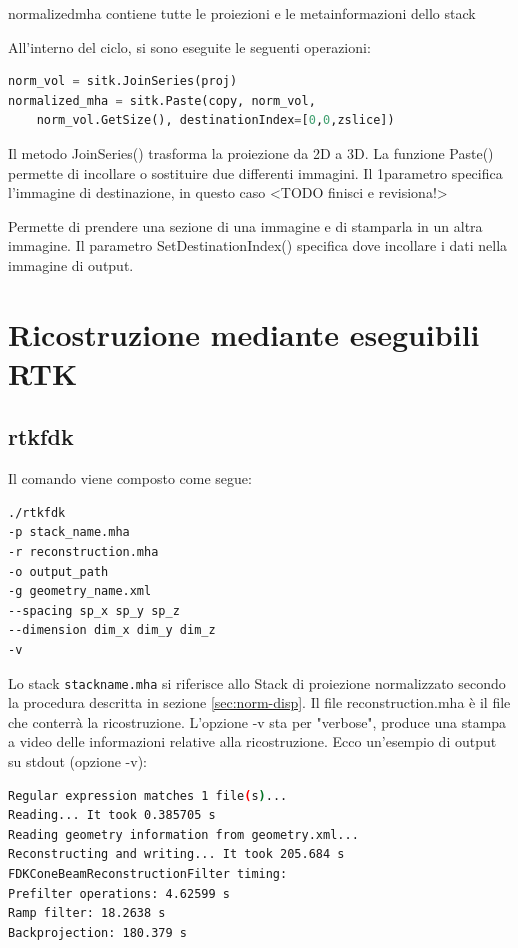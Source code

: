 \documentclass[a4paper,12pt, doubleside]{report}
\begin{document}
                    normalized\textunderscore mha contiene tutte le proiezioni e le metainformazioni dello stack 
                     
                    All'interno del ciclo, si sono eseguite le seguenti operazioni:
                    \begin{lstlisting}[language=python, frame=bt]
norm_vol = sitk.JoinSeries(proj)
normalized_mha = sitk.Paste(copy, norm_vol, 
    norm_vol.GetSize(), destinationIndex=[0,0,zslice])
                    \end{lstlisting}
                    
                    Il metodo JoinSeries() \cite{sitk-joinseries} trasforma la proiezione da 2D a 3D. La funzione Paste() \cite{sitk-paste} permette di incollare o sostituire due differenti immagini. Il 1\degree parametro specifica l'immagine di destinazione, in questo caso <TODO finisci e revisiona!>
                    
                    Permette di prendere una sezione di una immagine e di stamparla in un altra immagine. Il parametro SetDestinationIndex() specifica dove incollare i dati nella immagine di output. 
                    
                    
                    
        \section{Ricostruzione mediante eseguibili RTK}
            \subsection{rtkfdk}
                \par
                    Il comando viene composto come segue:
                    \begin{lstlisting}[language=bash, frame=bt]
./rtkfdk 
-p stack_name.mha 
-r reconstruction.mha
-o output_path 
-g geometry_name.xml 
--spacing sp_x sp_y sp_z 
--dimension dim_x dim_y dim_z 
-v
                    \end{lstlisting}
            
                    Lo stack \texttt{stack\textunderscore name.mha} si riferisce allo Stack di proiezione normalizzato secondo la procedura descritta in sezione \ref{sec:norm-disp}. Il file reconstruction.mha è il file che conterrà la ricostruzione. L'opzione -v sta per "verbose", produce una stampa a video delle informazioni relative alla ricostruzione.
                    Ecco un'esempio di output su stdout (opzione -v):
                    \begin{lstlisting}[language=bash, frame=bt]
Regular expression matches 1 file(s)...
Reading... It took 0.385705 s
Reading geometry information from geometry.xml...
Reconstructing and writing... It took 205.684 s
FDKConeBeamReconstructionFilter timing:
Prefilter operations: 4.62599 s
Ramp filter: 18.2638 s
Backprojection: 180.379 s
                    \end{lstlisting}
\end{document}
